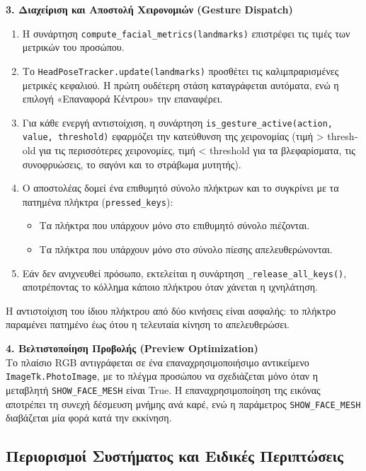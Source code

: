 \documentclass[twoside, a4paper, 11pt]{article}
\newcommand{\textlatin}[1]{\textenglish{#1}}
\begin{document}
\textbf{3. Διαχείριση και Αποστολή Χειρονομιών (\textlatin{Gesture Dispatch})}\\
\begin{enumerate}
    \item Η συνάρτηση \texttt{compute\_facial\_metrics(landmarks)} επιστρέφει τις τιμές των μετρικών του προσώπου.
    \item Το \texttt{HeadPoseTracker.update(landmarks)} προσθέτει τις καλιμπραρισμένες μετρικές κεφαλιού. Η πρώτη ουδέτερη στάση καταγράφεται αυτόματα, ενώ η επιλογή «Επαναφορά Κέντρου» την επαναφέρει.
    \item Για κάθε ενεργή αντιστοίχιση, η συνάρτηση \texttt{is\_gesture\_active(action, value, threshold)} εφαρμόζει την κατεύθυνση της χειρονομίας (τιμή > \textlatin{threshold} για τις περισσότερες χειρονομίες, τιμή < \textlatin{threshold} για τα βλεφαρίσματα, τις συνοφρυώσεις, το σαγόνι και το στράβωμα μυτητής).
    \item Ο αποστολέας δομεί ένα επιθυμητό σύνολο πλήκτρων και το συγκρίνει με τα πατημένα πλήκτρα (\texttt{pressed\_keys}):
    \begin{itemize}
        \item Τα πλήκτρα που υπάρχουν μόνο στο επιθυμητό σύνολο πιέζονται.
        \item Τα πλήκτρα που υπάρχουν μόνο στο σύνολο πίεσης απελευθερώνονται.
    \end{itemize}
    \item Εάν δεν ανιχνευθεί πρόσωπο, εκτελείται η συνάρτηση \texttt{\_release\_all\_keys()}, αποτρέποντας το κόλλημα κάποιο πλήκτρου όταν χάνεται η ιχνηλάτηση.
\end{enumerate}
Η αντιστοίχιση του ίδιου πλήκτρου από δύο κινήσεις είναι ασφαλής: το πλήκτρο παραμένει πατημένο έως ότου η τελευταία κίνηση το απελευθερώσει.

\textbf{4. Βελτιστοποίηση Προβολής (\textlatin{Preview Optimization})}\\
Το πλαίσιο \textlatin{RGB} αντιγράφεται σε ένα επαναχρησιμοποιήσιμο αντικείμενο \texttt{ImageTk.PhotoImage}, με το πλέγμα προσώπου να σχεδιάζεται μόνο όταν η μεταβλητή \texttt{SHOW\_FACE\_MESH} είναι \textlatin{True}. Η επαναχρησιμοποίηση της εικόνας αποτρέπει τη συνεχή δέσμευση μνήμης ανά καρέ, ενώ η παράμετρος \texttt{SHOW\_FACE\_MESH} διαβάζεται μία φορά κατά την εκκίνηση.
\subsection{Περιορισμοί Συστήματος και Ειδικές Περιπτώσεις}
\end{document}
